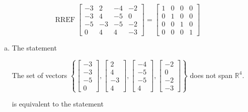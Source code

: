 \begin{exerciseAnswer} 


\[\operatorname{RREF} \left[\begin{array}{cccc}
-3 & 2 & -4 & -2 \\
-3 & 4 & -5 & 0 \\
-5 & -3 & -5 & -2 \\
0 & 4 & 4 & -3
\end{array}\right] = \left[\begin{array}{cccc}
1 & 0 & 0 & 0 \\
0 & 1 & 0 & 0 \\
0 & 0 & 1 & 0 \\
0 & 0 & 0 & 1
\end{array}\right] \]


\begin{enumerate}[(a)]
\item The statement 
\begin{center}\begin{minipage}{0.8\textwidth}
 The set of vectors \( \left\{ \left[\begin{array}{c}
-3 \\
-3 \\
-5 \\
0
\end{array}\right] , \left[\begin{array}{c}
2 \\
4 \\
-3 \\
4
\end{array}\right] , \left[\begin{array}{c}
-4 \\
-5 \\
-5 \\
4
\end{array}\right] , \left[\begin{array}{c}
-2 \\
0 \\
-2 \\
-3
\end{array}\right] \right\} \) does not span \(\mathbb{R}^4\). 
\end{minipage}\end{center}
     is equivalent to the statement 
\begin{center}\begin{minipage}{0.8\textwidth}
 The vector equation \( x_{1} \left[\begin{array}{c}
-3 \\
-3 \\

\end{array}
\end{minipage}
\end{center}
\end{enumerate}
\end{exerciseAnswer}
